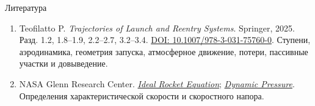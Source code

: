 \documentclass[11pt,aspectratio=169,t]{beamer}
\begin{document}
\begin{frame}{Литература}
\relax
\begin{enumerate}
\setlength{\itemsep}{8pt}
 \item Teofilatto P. \textit{Trajectories of Launch and Reentry Systems}.
 Springer, 2025. Разд. 1.2, 1.8--1.9, 2.2--2.7, 3.2--3.4.
 \href{https://doi.org/10.1007/978-3-031-75760-0}{DOI: 10.1007/978-3-031-75760-0}.
 Ступени, аэродинамика, геометрия запуска, атмосферное движение,
 потери, пассивные участки и довыведение.
 \item NASA Glenn Research Center.
 \href{https://www1.grc.nasa.gov/beginners-guide-to-aeronautics/ideal-rocket-equation/}{\textit{Ideal Rocket Equation}};
 \href{https://www1.grc.nasa.gov/beginners-guide-to-aeronautics/dynamic-pressure-2/}{\textit{Dynamic Pressure}}.
 Определения характеристической скорости и скоростного напора.
\end{enumerate}
\end{frame}
\end{document}
